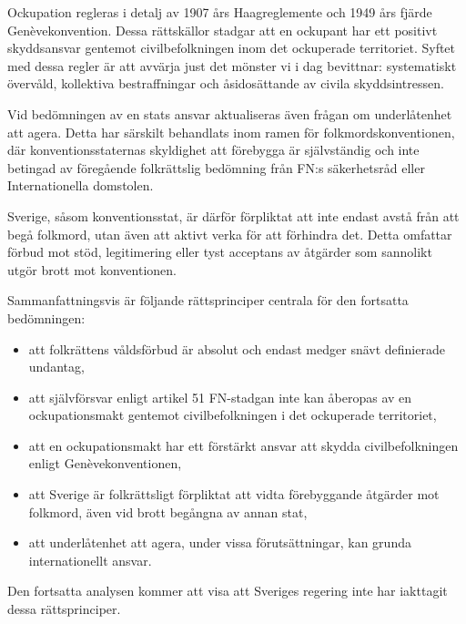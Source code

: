 Ockupation regleras i detalj av 1907 års Haagreglemente och 1949 års fjärde Genèvekonvention. Dessa rättskällor stadgar att en ockupant har ett positivt skyddsansvar gentemot civilbefolkningen inom det ockuperade territoriet. Syftet med dessa regler är att avvärja just det mönster vi i dag bevittnar: systematiskt övervåld, kollektiva bestraffningar och åsidosättande av civila skyddsintressen.



\medskip

Vid bedömningen av en stats ansvar aktualiseras även frågan om underlåtenhet att agera. Detta har särskilt behandlats inom ramen för folkmordskonventionen, där konventionsstaternas skyldighet att förebygga är självständig och inte betingad av föregående folkrättslig bedömning från FN:s säkerhetsråd eller Internationella domstolen.

Sverige, såsom konventionsstat, är därför förpliktat att inte endast avstå från att begå folkmord, utan även att aktivt verka för att förhindra det. Detta omfattar förbud mot stöd, legitimering eller tyst acceptans av åtgärder som sannolikt utgör brott mot konventionen.

\medskip

Sammanfattningsvis är följande rättsprinciper centrala för den fortsatta bedömningen:

\begin{itemize}
  \item att folkrättens våldsförbud är absolut och endast medger snävt definierade undantag,
  \item att självförsvar enligt artikel 51 FN-stadgan inte kan åberopas av en ockupationsmakt gentemot civilbefolkningen i det ockuperade territoriet,
  \item att en ockupationsmakt har ett förstärkt ansvar att skydda civilbefolkningen enligt Genèvekonventionen,
  \item att Sverige är folkrättsligt förpliktat att vidta förebyggande åtgärder mot folkmord, även vid brott begångna av annan stat,
  \item att underlåtenhet att agera, under vissa förutsättningar, kan grunda internationellt ansvar.
\end{itemize}

Den fortsatta analysen kommer att visa att Sveriges regering inte har iakttagit dessa rättsprinciper.
